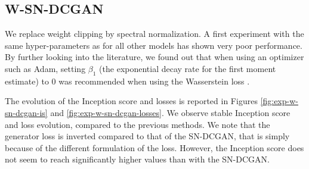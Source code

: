 \subsection{W-SN-DCGAN}
\label{sec:exp-wsndcgan}
We replace weight clipping by spectral normalization. A first experiment with the same hyper-parameters as for all other models has shown very poor performance. By further looking into the literature, we found out that when using an optimizer such as Adam, setting $\beta_1$ (the exponential decay rate for the first moment estimate) to 0 was recommended when using the Wasserstein loss \cite{arjovsky2017wasserstein}.

The evolution of the Inception score and losses is reported in Figures \ref{fig:exp-w-sn-dcgan-is} and \ref{fig:exp-w-sn-dcgan-losses}. We observe stable Inception score and loss evolution, compared to the previous methods. We note that the generator loss is inverted compared to that of the SN-DCGAN, that is simply because of the different formulation of the loss. However, the Inception score does not seem to reach significantly higher values than with the SN-DCGAN.

